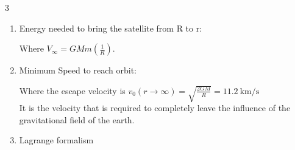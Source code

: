 \documentclass[10pt,a4paper]{scrartcl}
\begin{document}
\begin{multicols*}{3}
\begin{enumerate}
Kinetic energy $T(r,\dot{r},\dot{\varphi})=\onha m\dot{r}^2+\onha m(r\dot{\varphi})^2$

Potential energy V: $\mathbf{F}_{grav}(r)=m\mathbf{G}_{Earth}(r)=m\frac{GM}{r^2}\mathbf{u}$

Where $G=\SI{6.673e-11}{\meter\cubed\per\second\squared\per\kilo\gram}$

$M=\SI{5.97410e24}{\kilo\gram}$

$R=\SI{6.36719e6}{\meter}$

\item Energy needed to bring the satellite from R to r:



Where $V_\infty=GMm(\frac{1}{R})$.

\item Minimum Speed to reach orbit:



Where the escape velocity is $v_0(r\rightarrow\infty)=\sqrt{\frac{2GM}{R}}=\SI{11.2}{\kilo\meter\per\second}$ \\
It is the velocity that is required to completely leave the influence of the gravitational field of the earth.

\item Lagrange formalism





\end{enumerate}
\end{multicols*}
\end{document}
